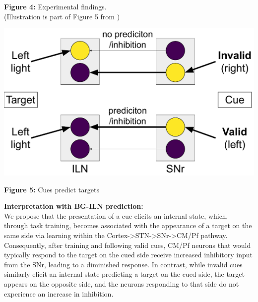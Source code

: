 \documentclass[portrait,final,a0paper,fontscale=0.30]{baposter}
\begin{document}
\begin{poster}
{\begin{adjustbox}{minipage=\textwidth, margin=2pt, center}
\begin{minipage}{0.25\textwidth}
\begin{center}
            \textbf{Figure 4:} Experimental findings. \\
            {\fontsize{4pt}{4.8pt}\selectfont (Illustration is part of Figure 5 from \parencite{minamimoto_participation_2002})} \\
        \end{center}
	\end{minipage}
    \hspace{0.01\textwidth}
	\begin{minipage}{0.25\textwidth}
        \centering
        \includegraphics[width=\linewidth]{figures/exp_interpretation.pdf}
        
        \textbf{Figure 5:} Cues predict targets
	\end{minipage}
    \hspace{0.01\textwidth}
	\begin{minipage}{0.22\textwidth}        
        \textbf{Interpretation with BG-ILN prediction:}\\
        We propose that the presentation of a cue elicits an internal state, which, through task training, becomes associated with the appearance of a target on the same side via learning within the Cortex->STN->SNr->CM/Pf pathway. Consequently, after training and following valid cues, CM/Pf neurons that would typically respond to the target on the cued side receive increased inhibitory input from the SNr, leading to a diminished response. In contrast, while invalid cues similarly elicit an internal state predicting a target on the cued side, the target appears on the opposite side, and the neurons responding to that side do not experience an increase in inhibition.
	\end{minipage}
    \hfill
	
\end{adjustbox}
}



\end{poster}
\end{document}
